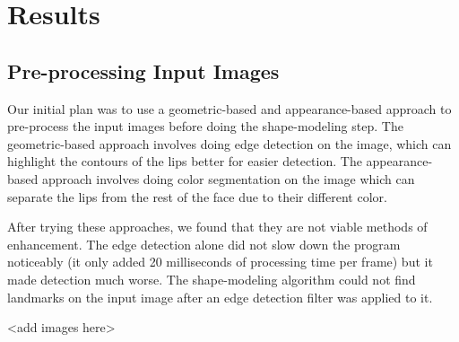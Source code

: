 \chapter{Results}

\section{Pre-processing Input Images}
Our initial plan was to use a geometric-based and appearance-based approach to pre-process the input images before doing the shape-modeling step. The geometric-based approach involves doing edge detection on the image, which can highlight the contours of the lips better for easier detection. The appearance-based approach involves doing color segmentation on the image which can separate the lips from the rest of the face due to their different color. 

After trying these approaches, we found that they are not viable methods of enhancement. The edge detection alone did not slow down the program noticeably (it only added 20 milliseconds of processing time per frame) but it made detection much worse. The shape-modeling algorithm could not find landmarks on the input image after an edge detection filter was applied to it. 



<add images here>